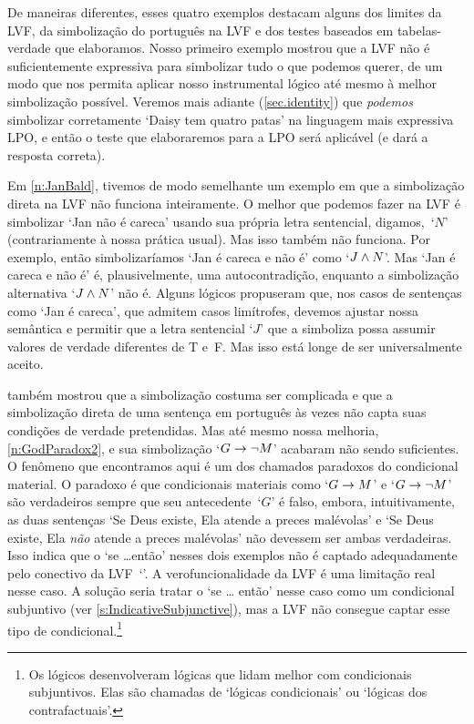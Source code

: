 De maneiras diferentes, esses quatro exemplos destacam alguns dos
limites da LVF, da simbolização do português na LVF e dos testes baseados
em tabelas-verdade que elaboramos. Nosso primeiro exemplo mostrou que a
LVF não é suficientemente expressiva para simbolizar tudo o que podemos
querer, de um modo que nos permita aplicar nosso instrumental lógico até
mesmo à melhor simbolização possível. Veremos mais adiante
(\cref{sec.identity}) que \emph{podemos} simbolizar corretamente `Daisy
tem quatro patas' na linguagem mais expressiva LPO, e então o teste que
elaboraremos para a LPO será aplicável (e dará a resposta correta).

Em \cref{n:JanBald}, tivemos de modo semelhante um exemplo em que a
simbolização direta na LVF não funciona inteiramente. O melhor que podemos
fazer na LVF é simbolizar `Jan não é careca' usando sua própria letra
sentencial, digamos,~`$N$' (contrariamente à nossa prática usual). Mas isso
também não funciona. Por exemplo, então simbolizaríamos `Jan é careca e
não é' como `$J \wedge N$'. Mas `Jan é careca e não é' é, plausivelmente,
uma autocontradição, enquanto a simbolização alternativa `$J \wedge N$' não
é. Alguns lógicos propuseram que, nos casos de sentenças como `Jan é
careca', que admitem casos limítrofes, devemos ajustar nossa semântica e
permitir que a letra sentencial `$J$' que a simboliza possa assumir valores
de verdade diferentes de T e~F. Mas isso está longe de ser universalmente
aceito.

 também mostrou que a simbolização costuma ser
complicada e que a simbolização direta de uma sentença em português às
vezes não capta suas condições de verdade pretendidas. Mas até mesmo nossa
melhoria, \cref{n:GodParadox2}, e sua simbolização `$G \rightarrow
\neg M$' acabaram não sendo suficientes. O fenômeno que encontramos aqui
é um dos chamados paradoxos do condicional material. O paradoxo é que
condicionais materiais como `$G \rightarrow M$' e `$G \rightarrow \neg M$' são
verdadeiros sempre que seu antecedente~`$G$' é falso, embora, intuitivamente,
as duas sentenças `Se Deus existe, Ela atende a preces malévolas' e `Se Deus
existe, Ela \emph{não} atende a preces malévolas' não devessem ser ambas
verdadeiras. Isso indica que o `se \dots então' nesses dois exemplos não é
captado adequadamente pelo conectivo da LVF~`\eif'. A verofuncionalidade da
LVF é uma limitação real nesse caso. A solução seria tratar o `se \dots
então' nesse caso como um condicional subjuntivo (ver
\cref{s:IndicativeSubjunctive}), mas a LVF não consegue captar esse tipo de
condicional.\footnote{Os lógicos desenvolveram lógicas que lidam melhor com
condicionais subjuntivos. Elas são chamadas de `lógicas condicionais' ou
`lógicas dos contrafactuais'.}

